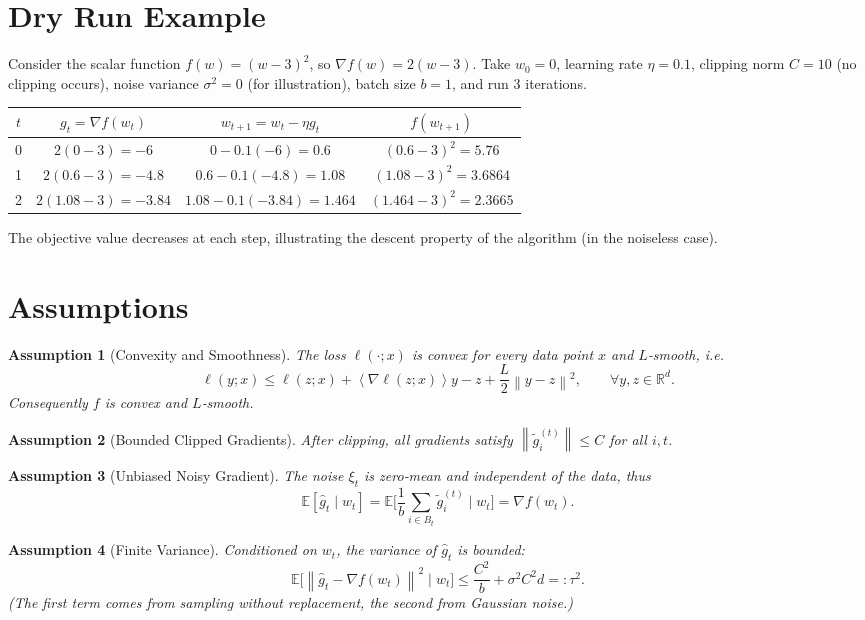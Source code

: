 \documentclass{article}
\newcommand{\R}{\mathbb{R}}
\newcommand{\E}{\mathbb{E}}
\newcommand{\norm}[1]{\left\lVert #1\right\rVert}
\newcommand{\inner}[1]{\left\langle #1\right\rangle}
\newtheorem{assumption}{Assumption}
\begin{document}
\section*{Dry Run Example}
Consider the scalar function $f(w)=(w-3)^2$, so $\nabla f(w)=2(w-3)$.  
Take $w_0=0$, learning rate $\eta=0.1$, clipping norm $C=10$ (no clipping occurs), noise variance $\sigma^2=0$ (for illustration), batch size $b=1$, and run $3$ iterations.

\begin{center}
\begin{tabular}{c|c|c|c}
$t$ & $g_t=\nabla f(w_t)$ & $w_{t+1}=w_t-\eta g_t$ & $f(w_{t+1})$\\ \hline
0 & $2(0-3)=-6$ & $0-0.1(-6)=0.6$ & $(0.6-3)^2=5.76$\\
1 & $2(0.6-3)=-4.8$ & $0.6-0.1(-4.8)=1.08$ & $(1.08-3)^2=3.6864$\\
2 & $2(1.08-3)=-3.84$ & $1.08-0.1(-3.84)=1.464$ & $(1.464-3)^2=2.3665$\\
\end{tabular}
\end{center}
The objective value decreases at each step, illustrating the descent property of the algorithm (in the noiseless case).

\newpage

\section*{Assumptions}
\begin{assumption}[Convexity and Smoothness]\label{ass:convex}
The loss $\ell(\cdot;x)$ is convex for every data point $x$ and $L$‑smooth, i.e.
\[
\ell(y;x)\le \ell(z;x)+\inner{\nabla\ell(z;x)}{y-z}+\frac{L}{2}\norm{y-z}^{2},
\qquad\forall y,z\in\R^{d}.
\]
Consequently $f$ is convex and $L$‑smooth.
\end{assumption}
\begin{assumption}[Bounded Clipped Gradients]\label{ass:clip}
After clipping, all gradients satisfy $\norm{\tilde g_i^{(t)}}\le C$ for all $i,t$.
\end{assumption}
\begin{assumption}[Unbiased Noisy Gradient]\label{ass:unbiased}
The noise $\xi_t$ is zero‑mean and independent of the data, thus
\[
\E[\hat g_t\mid w_t]=\E\!\Big[\frac{1}{b}\sum_{i\in B_t}\tilde g_i^{(t)}\;\Big|\;w_t\Big]=\nabla f(w_t).
\]
\end{assumption}
\begin{assumption}[Finite Variance]\label{ass:variance}
Conditioned on $w_t$, the variance of $\hat g_t$ is bounded:
\[
\E\!\big[\norm{\hat g_t-\nabla f(w_t)}^{2}\mid w_t\big]\le
\frac{C^{2}}{b}+ \sigma^{2}C^{2}d
=: \tau^{2}.
\]
(The first term comes from sampling without replacement, the second from Gaussian noise.)
\end{assumption}
\end{document}
